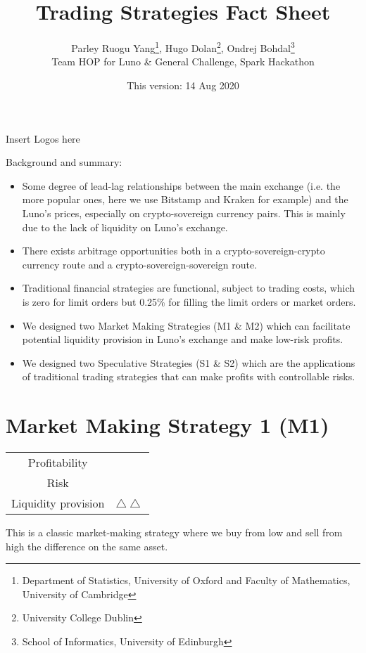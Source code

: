 \documentclass[12pt,a4paper]{article}
\author{Parley Ruogu Yang\footnote{Department of Statistics, University of Oxford and Faculty of Mathematics, University of Cambridge}, Hugo Dolan\footnote{University College Dublin}, Ondrej Bohdal\footnote{School of Informatics, University of Edinburgh} \\ Team HOP for Luno \& General Challenge, Spark Hackathon }
\title{Trading Strategies Fact Sheet}
\date{This version: 14 Aug 2020}
\begin{document}
\thispagestyle{empty}


	\maketitle
	\vfill
	Insert  Logos here
	
\vfill
		Background and summary: \begin{itemize}
		\item Some degree of lead-lag relationships between the main exchange (i.e. the more popular ones, here we use Bitstamp and Kraken for example) and the Luno's prices, especially on crypto-sovereign currency pairs. This is mainly due to the lack of liquidity on Luno's exchange.
		\item There exists arbitrage opportunities both in a crypto-sovereign-crypto currency route and a crypto-sovereign-sovereign route. 
		\item Traditional financial strategies are functional, subject to trading costs, which is zero for limit orders but 0.25\% for filling the limit orders or market orders.
		\item We designed two Market Making Strategies (M1 \& M2) which can facilitate potential liquidity provision in Luno's exchange and make low-risk profits.
		\item We designed two Speculative Strategies (S1 \& S2) which are the applications of traditional trading strategies that can  make profits with controllable risks.
	\end{itemize}
\vfill
	\pagebreak
		\section{Market Making Strategy 1 (M1)}
		\begin{table}[h]
			\centering
		\begin{tabular}{c|c}
			
		Profitability& \textdollaroldstyle \\
		
		Risk & \Radioactivity \\
		
		Liquidity provision &$ \bigtriangleup \bigtriangleup $\\
		
		\end{tabular}
		\end{table}
	
This is a classic market-making strategy where we buy from low and sell from high the difference on the same asset.
\end{document}
